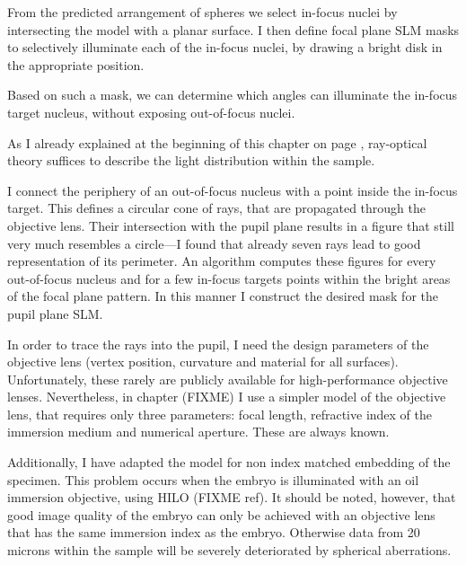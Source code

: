 From the predicted arrangement of spheres we select in-focus nuclei by
intersecting the model with a planar surface. I then define focal
plane SLM masks to selectively illuminate each of the in-focus nuclei,
by drawing a bright disk in the appropriate position.

Based on such a mask, we can determine which angles can illuminate the
in-focus target nucleus, without exposing out-of-focus nuclei.

As I already explained at the beginning of this chapter on page
\pageref{sec:ray-valid}, ray-optical theory suffices to describe the
light distribution within the sample.

I connect the periphery of an out-of-focus nucleus with a point inside
the in-focus target. This defines a circular cone of rays, that are
propagated through the objective lens. Their intersection with the
pupil plane results in a figure that still very much resembles a
circle---I found that already seven rays lead to good representation
of its perimeter.  An algorithm computes these figures for every
out-of-focus nucleus and for a few in-focus targets points within the
bright areas of the focal plane pattern. In this manner I construct
the desired mask for the pupil plane SLM.

In order to trace the rays into the pupil, I need the design
parameters of the objective lens (vertex position, curvature and
material for all surfaces). Unfortunately, these rarely are publicly
available for high-performance objective lenses. Nevertheless, in
chapter (FIXME) I use a simpler model of the objective lens, that
requires only three parameters: focal length, refractive index of the
immersion medium and numerical aperture. These are always known.

Additionally, I have adapted the model for non index matched embedding
of the specimen. This problem occurs when the embryo is illuminated
with an oil immersion objective, using HILO (FIXME ref). It should be
noted, however, that good image quality of the embryo can only be
achieved with an objective lens that has the same immersion index as
the embryo. Otherwise data from 20 microns within the sample will be
severely deteriorated by spherical aberrations.
